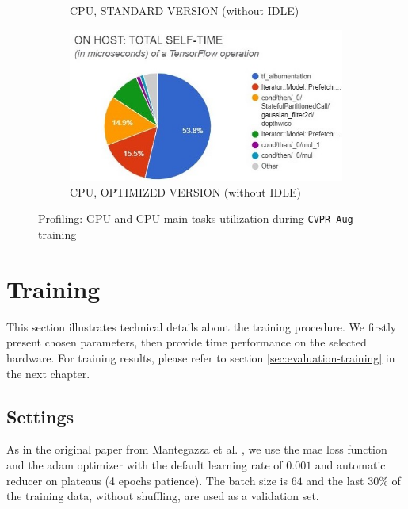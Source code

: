 \begin{figure}[!h]
\begin{center}
\begin{subfigure}[h]{0.49\textwidth}
			\caption[]{CPU, STANDARD VERSION (without IDLE)}
		\end{subfigure}
		\hfill
		\begin{subfigure}[h]{0.49\textwidth}
			\centering
			\includegraphics[width=1\textwidth]{"contents/images/05-profiling-CVPRaug-opt-cpu"}
			\caption[]{CPU, OPTIMIZED VERSION (without IDLE)}
		\end{subfigure}
	\end{center}
	\caption[Profiling: GPU and CPU main tasks utilization during \texttt{CVPR Aug} training]{Profiling: GPU and CPU main tasks utilization during \texttt{CVPR Aug} training}
	\label{fig:profiling-cvpraug-gpu}
\end{figure}






\section{Training}
\label{sec:implementation-training}

This section illustrates technical details about the training procedure. We firstly present chosen parameters, then provide time performance on the selected hardware. For training results, please refer to section \ref{sec:evaluation-training} in the next chapter.



\subsection{Settings}
\label{subsec:training-params}


As in the original paper from Mantegazza et al. \cite{mantegazza2019visionbased}, we use the \gls{mae} loss function and the \gls{adam} optimizer \cite{kingma2014adam} with the default learning rate of $0.001$ and automatic reducer on plateaus (4 epochs patience). The batch size is $64$ and the last 30\% of the training data, without shuffling, are used as a validation set.

